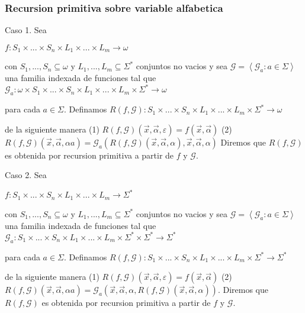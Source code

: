 \subsubsection{Recursion primitiva sobre variable alfabetica}

Caso 1. Sea

\(\displaystyle f:S_{1}\times ...\times S_{n}\times L_{1}\times ...\times L_{m}\rightarrow \omega \)

con \(S_{1},...,S_{n}\subseteq \omega \) y \(L_{1},...,L_{m}\subseteq \Sigma ^{\ast }\) conjuntos no vacios y sea \(\mathcal{G}=\left\langle \mathcal{G} _{a}:a\in \Sigma \right\rangle \) una familia indexada de funciones tal que
\(\displaystyle \mathcal{G}_{a}:\omega \times S_{1}\times ...\times S_{n}\times L_{1}\times ...\times L_{m}\times \Sigma ^{\ast }\rightarrow \omega \)

para cada \(a\in \Sigma .\) Definamos
\(\displaystyle R(f,\mathcal{G}):S_{1}\times ...\times S_{n}\times L_{1}\times ...\times L_{m}\times \Sigma ^{\ast }\rightarrow \omega \)

de la siguiente manera
(1) \(R(f,\mathcal{G})(\vec{x},\vec{\alpha},\varepsilon )=f(\vec{x}, \vec{\alpha})\)
(2) \(R(f,\mathcal{G})(\vec{x},\vec{\alpha},\alpha a)=\mathcal{G} _{a}(R(f,\mathcal{G})(\vec{x},\vec{\alpha},\alpha ),\vec{x},\vec{\alpha} ,\alpha )\)
Diremos que \(R(f,\mathcal{G})\) es obtenida por recursion primitiva a partir de \(f\) y \(\mathcal{G}.\)

Caso 2. Sea

\(\displaystyle f:S_{1}\times ...\times S_{n}\times L_{1}\times ...\times L_{m}\rightarrow \Sigma ^{\ast } \)

con \(S_{1},...,S_{n}\subseteq \omega \) y \(L_{1},...,L_{m}\subseteq \Sigma ^{\ast }\) conjuntos no vacios y sea \(\mathcal{G}=\left\langle \mathcal{G} _{a}:a\in \Sigma \right\rangle \) una familia indexada de funciones tal que
\(\displaystyle \mathcal{G}_{a}:S_{1}\times ...\times S_{n}\times L_{1}\times ...\times L_{m}\times \Sigma ^{\ast }\times \Sigma ^{\ast }\rightarrow \Sigma ^{\ast } \)

para cada \(a\in \Sigma \). Definamos
\(\displaystyle R(f,\mathcal{G}):S_{1}\times ...\times S_{n}\times L_{1}\times ...\times L_{m}\times \Sigma ^{\ast }\rightarrow \Sigma ^{\ast } \)

de la siguiente manera
(1) \(R(f,\mathcal{G})(\vec{x},\vec{\alpha},\varepsilon )=f(\vec{x}, \vec{\alpha})\)
(2) \(R(f,\mathcal{G})(\vec{x},\vec{\alpha},\alpha a)=\mathcal{G}_{a}( \vec{x},\vec{\alpha},\alpha ,R(f,\mathcal{G})(\vec{x},\vec{\alpha},\alpha )). \)
Diremos que \(R(f,\mathcal{G})\) es obtenida por recursion primitiva a partir de \(f\) y \(\mathcal{G}.\)

